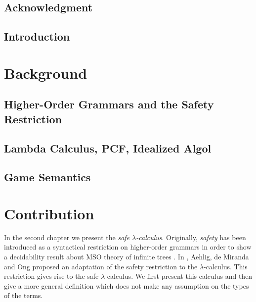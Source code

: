 \begin{romanpages}
\tableofcontents
\listoffigures
\end{romanpages}

    \chapter*{Acknowledgment}

    \chapter{Introduction}
    


\part{Background}
    \chapter{Higher-Order Grammars and the Safety Restriction}
    

    \chapter{Lambda Calculus, PCF, Idealized Algol}
    

    \chapter{Game Semantics}
    



\part{Contribution}


In the second chapter we present the \emph{safe $\lambda$-calculus}.
Originally, \emph{safety} has been introduced as a syntactical
restriction on higher-order grammars in order to show a decidability
result about MSO theory of infinite trees \citep{KNU02}. In
\cite{safety-mirlong2004}, Aehlig, de Miranda and Ong  proposed an
adaptation of the safety restriction to the $\lambda$-calculus. This
restriction gives rise to the safe $\lambda$-calculus. We first
present this calculus and then give a more general definition which
does not make any assumption on the types of the terms.


